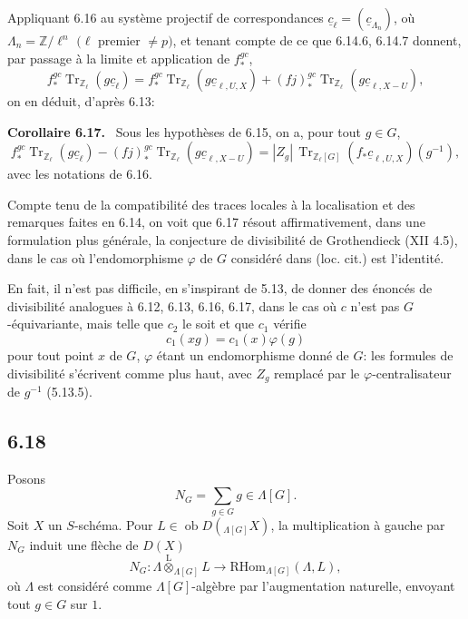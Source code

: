 \documentclass[11pt]{article}
\newenvironment{statement}[1]{\par\medskip\noindent\textbf{#1.}\ }{\par\medskip}
\providecommand{\RHom}{\mathrm{RHom}}
\providecommand{\Tr}{\operatorname{Tr}}
\providecommand{\Tr}{\operatorname{Tr}}
\providecommand{\lten}{\overset{\mathrm L}{\otimes}}
\providecommand{\Ob}{\operatorname{ob}}
\providecommand{\Tr}{\operatorname{Tr}}
\providecommand{\RHom}{\mathrm{RHom}}
\providecommand{\lten}{\overset{\mathrm L}{\otimes}}
\providecommand{\RHom}{\mathrm R\mathcal{H}om}
\providecommand{\lten}{\overset{\mathrm L}{\otimes}}
\providecommand{\Ob}{\operatorname{ob}}
\providecommand{\Tr}{\operatorname{Tr}}
\providecommand{\lten}{\overset{\mathrm L}{\otimes}}
\providecommand{\lten}{\overset{\mathrm L}{\otimes}}
\providecommand{\Ob}{\operatorname{Ob}}
\providecommand{\lten}{\overset{\mathrm L}{\otimes}}
\providecommand{\RHom}{\mathrm{RHom}}
\providecommand{\Tr}{\operatorname{Tr}}
\providecommand{\Ob}{\operatorname{ob}}
\providecommand{\Ob}{\operatorname{Ob}}
\providecommand{\lten}{\overset{\mathrm L}{\otimes}}
\begin{document}
Appliquant 6.16 au système projectif de correspondances $\underline c_{\ell}=(\underline c_{\Lambda_n})$, où $\Lambda_n=\mathbb Z/\ell^n$ $(\ell$ premier $\ne p)$, et tenant compte de ce que 6.14.6, 6.14.7 donnent, par passage à la limite et application de $f_*^{gc}$,
\[
f_*^{gc}\Tr_{\mathbb Z_{\ell}}(g\underline c_{\ell})
=
f_*^{gc}\Tr_{\mathbb Z_{\ell}}(g\underline c_{\ell,U,X})
+(fj)_*^{gc}\Tr_{\mathbb Z_{\ell}}(g\underline c_{\ell,X-U}),
\]
on en déduit, d'après 6.13:

\begin{statement}{Corollaire 6.17}
Sous les hypothèses de 6.15, on a, pour tout $g\in G$,
\begin{equation}
f_*^{gc}\Tr_{\mathbb Z_{\ell}}(g\underline c_{\ell})
-(fj)_*^{gc}\Tr_{\mathbb Z_{\ell}}(g\underline c_{\ell,X-U})
=
|Z_g|\,\Tr_{\mathbb Z_{\ell}[G]}(f_*\underline c_{\ell,U,X})(g^{-1}),
\tag{6.17.1}
\end{equation}
avec les notations de 6.16.
\end{statement}

Compte tenu de la compatibilité des traces locales à la localisation et des remarques faites en 6.14, on voit que 6.17 résout affirmativement, dans une formulation plus générale, la conjecture de divisibilité de Grothendieck (XII 4.5), dans le cas où l'endomorphisme $\varphi$ de $G$ considéré dans (loc. cit.) est l'identité.

En fait, il n'est pas difficile, en s'inspirant de 5.13, de donner des énoncés de divisibilité analogues à 6.12, 6.13, 6.16, 6.17, dans le cas où $c$ n'est pas $G$-équivariante, mais telle que $c_2$ le soit et que $c_1$ vérifie
\[
c_1(xg)=c_1(x)\varphi(g)
\]
pour tout point $x$ de $G$, $\varphi$ étant un endomorphisme donné de $G$: les formules de divisibilité s'écrivent comme plus haut, avec $Z_g$ remplacé par le $\varphi$-centralisateur de $g^{-1}$ (5.13.5).

\subsection*{6.18}
Posons
\begin{equation}
N_G=\sum_{g\in G} g\in\Lambda[G].
\tag{6.18.1}
\end{equation}
Soit $X$ un $S$-schéma. Pour $L\in\Ob D({}_{\Lambda[G]}X)$, la multiplication à gauche par $N_G$ induit une flèche de $D(X)$
\begin{equation}
N_G:\Lambda\lten_{\Lambda[G]}L
\longrightarrow
\RHom_{\Lambda[G]}(\Lambda,L),
\tag{6.18.2}
\end{equation}
où $\Lambda$ est considéré comme $\Lambda[G]$-algèbre par l'augmentation naturelle, envoyant tout $g\in G$ sur $1$.
\end{document}
